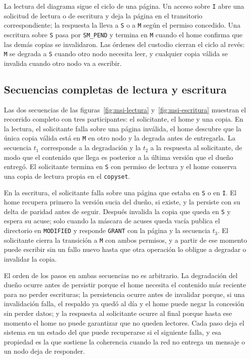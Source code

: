 La lectura del diagrama sigue el ciclo de una página. Un acceso sobre \texttt{I} abre una solicitud de lectura o de escritura y deja la página en el transitorio correspondiente; la respuesta la lleva a \texttt{S} o a \texttt{M} según el permiso concedido. Una escritura sobre \texttt{S} pasa por \texttt{SM\_PEND} y termina en \texttt{M} cuando el home confirma que las demás copias se invalidaron. Las órdenes del custodio cierran el ciclo al revés: \texttt{M} se degrada a \texttt{S} cuando otro nodo necesita leer, y cualquier copia válida se invalida cuando otro nodo va a escribir.

\subsection{Secuencias completas de lectura y escritura}\label{sec:msi-secuencias}

Las dos secuencias de las figuras~\ref{fig:msi-lectura} y~\ref{fig:msi-escritura} muestran el recorrido completo con tres participantes: el solicitante, el home y una copia. En la lectura, el solicitante falla sobre una página inválida, el home descubre que la única copia válida está en \texttt{M} en otro nodo y la degrada antes de entregarla. La secuencia $t_1$ corresponde a la degradación y la $t_2$ a la respuesta al solicitante, de modo que el contenido que llega es posterior a la última versión que el dueño entregó. El solicitante termina en \texttt{S} con permiso de lectura y el home conserva una copia de lectura propia en el \texttt{copyset}.

En la escritura, el solicitante falla sobre una página que estaba en \texttt{S} o en \texttt{I}. El home recupera primero la versión sucia del dueño, si existe, y la persiste con su delta de paridad antes de seguir. Después invalida la copia que queda en \texttt{S} y espera su acuse; solo cuando la máscara de acuses queda vacía publica el directorio en \texttt{MODIFIED} y responde \texttt{GRANT} con la página y la secuencia $t_3$. El solicitante cierra la transición a \texttt{M} con ambos permisos, y a partir de ese momento puede escribir sin un fallo nuevo hasta que otra operación lo obligue a degradar o invalidar la copia.

El orden de los pasos en ambas secuencias no es arbitrario. La degradación del dueño ocurre antes de persistir porque el home necesita el contenido más reciente para no perder escrituras; la persistencia ocurre antes de invalidar porque, si una invalidación falla, el respaldo ya quedó al día y el home puede negar la concesión sin perder datos; y la respuesta al solicitante ocurre al final porque hasta ese momento el home no puede garantizar que no queden lectores. Cada paso deja el sistema en un estado del que puede recuperarse si el siguiente falla, y esa propiedad es la que sostiene la coherencia cuando la red no entrega un mensaje o un nodo deja de responder.

